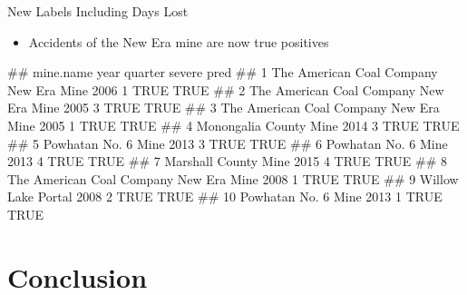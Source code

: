 \documentclass[
]{beamer}
\providecommand{\tightlist}{%
  \setlength{\itemsep}{0pt}\setlength{\parskip}{0pt}}
\let\oldverbatim\verbatim
\let\endoldverbatim\endverbatim
\renewenvironment{verbatim}{\footnotesize\oldverbatim}{\endoldverbatim}
\begin{document}
\begin{frame}[fragile]{New Labels Including Days Lost}

\begin{itemize}
\tightlist
\item
  Accidents of the New Era mine are now true positives
\end{itemize}

\begin{verbatim}
##                                 mine.name year quarter severe pred
## 1  The American Coal Company New Era Mine 2006       1   TRUE TRUE
## 2  The American Coal Company New Era Mine 2005       3   TRUE TRUE
## 3  The American Coal Company New Era Mine 2005       1   TRUE TRUE
## 4                  Monongalia County Mine 2014       3   TRUE TRUE
## 5                     Powhatan No. 6 Mine 2013       3   TRUE TRUE
## 6                     Powhatan No. 6 Mine 2013       4   TRUE TRUE
## 7                    Marshall County Mine 2015       4   TRUE TRUE
## 8  The American Coal Company New Era Mine 2008       1   TRUE TRUE
## 9                      Willow Lake Portal 2008       2   TRUE TRUE
## 10                    Powhatan No. 6 Mine 2013       1   TRUE TRUE
\end{verbatim}

\end{frame}

\section{Conclusion}\label{conclusion}
\end{document}

